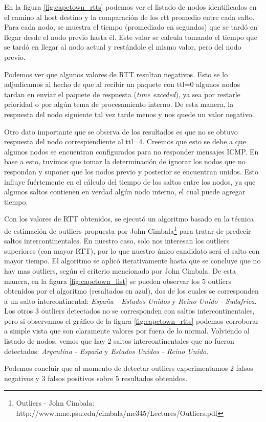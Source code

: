 \par En la figura \ref{fig:capetown_rtts} podemos ver el listado de nodos identificados en el camino al host destino y la comparación de los rtt promedio entre cada salto. Para cada nodo, se muestra el tiempo (promediado en segundos) que se tardó en llegar desde el nodo previo hasta él. Este valor se calcula tomando el tiempo que se tardó en llegar al nodo actual y restándole el mismo valor, pero del nodo previo.
\par Podemos ver que algunos valores de RTT resultan negativos. Esto se lo adjudicamos al hecho de que al recibir un paquete con ttl=0 algunos nodos tardan en enviar el paquete de respuesta (\textit{time exceded}), ya sea por restarle prioridad o por algún tema de procesamiento interno. De esta manera, la respuesta del nodo siguiente tal vez tarde menos y nos quede un valor negativo.
\par Otro dato importante que se observa de los resultados es que no se obtuvo respuesta del nodo correspiendiente al ttl=4. Creemos que esto se debe a que algunos nodos se encuentran configurados para no responder mensajes ICMP. En base a esto, tuvimos que tomar la determinación de ignorar los nodos que no respondan y suponer que los nodos previo y posterior se encuentran unidos. Esto influye fuértemente en el cálculo del tiempo de los saltos entre los nodos, ya que algunos saltos contienen en verdad algún nodo interno, el cual puede agregar tiempo.
\par Con los valores de RTT obtenidos, se ejecutó un algoritmo basado en la técnica de estimación de outliers propuesta por John Cimbala\footnote{Outliers - John Cimbala: http://www.mne.psu.edu/cimbala/me345/Lectures/Outliers.pdf} para tratar de predecir saltos intercontinentales. En nuestro caso, solo nos interesan los outliers superiores (con mayor RTT), por lo que nuestro único candidato será el salto con mayor tiempo. El algoritmo se aplicó iterativamente hasta que se concluye que no hay mas outliers, según el criterio mencionado por John Cimbala. De esta manera, en la figura \ref{fig:capetown_list} se pueden observar los 5 outliers obtenidos por el algoritmo (resaltados en azul), dos de los cuales se corresponden a un salto intercontinental: \textit{España - Estados Unidos} y \textit{Reino Unido - Sudafrica}. Los otros 3 outliers detectados no se corresponden con saltos intercontinentales, pero si observamos el gráfico de la figura \ref{fig:capetown_rtts} podemos corroborar a simple vista que son claramente valores por fuera de lo normal. Volviendo al listado de nodos, vemos que hay 2 saltos intercontinentales que no fueron detectados: \textit{Argentina - España} y \textit{Estados Unidos - Reino Unido}.
\par Podemos concluir que al momento de detectar outliers experimentamos 2 falsos negativos y 3 falsos positivos sobre 5 resultados obtenidos.
